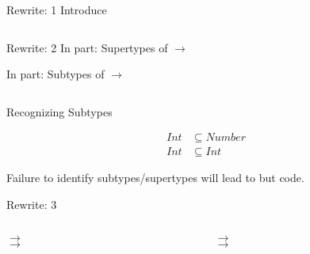\begin{frame}{Rewrite: 1}
  Introduce \colorbox{pink!30}{}

  \begin{columns}
    \begin{column}{0.5\textwidth}
      \usebox\typecaseAbox
    \end{column}
    \begin{column}{0.5\textwidth}  %
      \usebox\typecaseBbox
    \end{column}    
  \end{columns}
\end{frame}




\begin{frame}{Rewrite: 2}
  In  part: \colorbox{pink!30}{Supertypes of  $\to$  }
  
  In  part: \colorbox{pink!30}{Subtypes of  $\to$ }

  \begin{columns}
    \begin{column}{0.5\textwidth}
      \usebox\typecaseBbox
    \end{column}
    \begin{column}{0.5\textwidth}  %
      \usebox\typecaseChbox
    \end{column}    
  \end{columns}
\end{frame}


\begin{frame}{Recognizing Subtypes}
  \centering

  \begin{align*}
    Int&\subseteq Number\\
    Int&\subseteq Int
  \end{align*}

  \scalebox{0.8}{}


  Failure to identify subtypes/supertypes will lead to  but  code.
\end{frame}




\begin{frame}{Rewrite: 3}
  \begin{columns}
    \begin{column}{0.5\textwidth}
      \colorbox{pink!30}{ $\to$ }\\
      \colorbox{pink!30}{ $\to$ }
      
      \usebox\typecaseCbox
    \end{column}
    \begin{column}{0.5\textwidth}  %
      \colorbox{pink!30}{ $\to$ }\\
      \colorbox{pink!30}{ $\to$ }

      \usebox\typecaseDhbox
    \end{column}    
  \end{columns}
\end{frame}

